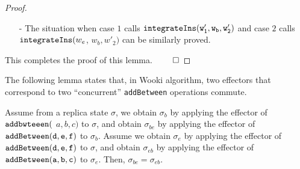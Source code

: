 \begin {proof}
\begin{itemize}
\begin{itemize}
        \begin{itemize}
        \setlength{\itemsep}{0.5pt}
        \item[-] If $w_b <_{id} w'''_n$, then, case $1$ and case $2$ work in the same way.

        \item[-] Else, we can see that $w'''_n <_{id} w_b <_{id} w_e$, case $1$ recursively calls $\alabelshort[{\tt integrateIns}]{w'''_n,w_b,w}$, and case $2$ recursively calls $\alabelshort[{\tt integrateIns}]{w'''_n,w_b,w_e}$. We can see that the order of $\{ w'''_1,\ldots,w'''_n,w_b \}$ is the same for case $1$ and case $2$.
        \end{itemize}

    \item[-] Let us consider the situation of $w''_n <_{\sigma_e} w_e$. Similarly, we can prove the $w''_n <_{id} w_e$. Therefore, we have $w''_1 <_{id} \ldots <_{id} w''_n <_{id} w_e$. Then,
        \begin{itemize}
        \setlength{\itemsep}{0.5pt}
        \item[-] If $w_b <_{id} w''_n$, then, case $1$ and case $2$ work in the same way.

        \item[-] Else, if $w''_n <_{id} w_b <_{id} w_e$, case $1$ recursively calls $\alabelshort[{\tt integrateIns}]{w''_n,w_b,w'_2}$, and case $2$ recursively calls $\alabelshort[{\tt integrateIns}]{w''_n,w_b,w_e}$. We can see that the order of $\{ w''_1,\ldots,w''_n,w_b \}$ is the same for case $1$ and case $2$.
        \end{itemize}
    \end{itemize}

\item[-] The situation when case $1$ calls $\alabelshort[{\tt integrateIns}]{w'_1,w_b,w'_2}$ and case $2$ calls ${\tt integrateIns}(w_e$, $w_b,w'_2)$ can be similarly proved.
\end{itemize}

This completes the proof of this lemma. $\qed$
\end {proof}



The following lemma states that, in Wooki algorithm, two effectors that correspond to two ``concurrent'' {\tt addBetween} operations commute.

\begin{lemma}
\label{lemma:in Wooki algorithm, two downstreams of two addBetween operations commute}
Assume from a replica state $\sigma$, we obtain $\sigma_b$ by applying the effector of ${\tt addbwteeen}($ $a,b,c)$ to $\sigma$, and obtain $\sigma_{be}$ by applying the effector of $\alabelshort[{\tt addBetween}]{d,e,f}$ to $\sigma_b$. Assume we obtain $\sigma_e$ by applying the effector of $\alabelshort[{\tt addBetween}]{d,e,f}$ to $\sigma$, and obtain $\sigma_{eb}$ by applying the effector of $\alabelshort[{\tt addBetween}]{a,b,c}$ to $\sigma_e$. Then, $\sigma_{be} = \sigma_{eb}$.
\end{lemma}

